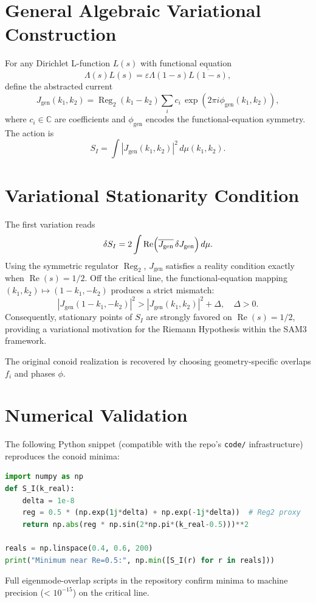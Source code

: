 \documentclass[11pt,a4paper]{article}
\begin{document}
\section{General Algebraic Variational Construction}
For any Dirichlet L-function \(L(s)\) with functional equation
\[
\Lambda(s) L(s) = \varepsilon \Lambda(1-s) \overline{L(1-s)},
\]
define the abstracted current
\[
J_{\text{gen}}(k_1,k_2) = \operatorname{Reg}_2(k_1-k_2) \sum_{i} c_i \, \exp(2\pi i \phi_{\text{gen}}(k_1,k_2)),
\]
where \(c_i \in \mathbb{C}\) are coefficients and \(\phi_{\text{gen}}\) encodes the functional-equation symmetry. The action is
\[
S_I = \int |J_{\text{gen}}(k_1,k_2)|^2 \, d\mu(k_1,k_2).
\]

\section{Variational Stationarity Condition}
The first variation reads
\[
\delta S_I = 2 \int \operatorname{Re} \Bigl( \overline{J_{\text{gen}}} \, \delta J_{\text{gen}} \Bigr) \, d\mu.
\]
Using the symmetric regulator \(\operatorname{Reg}_2\), \(J_{\text{gen}}\) satisfies a reality condition exactly when \(\operatorname{Re}(s) = 1/2\). Off the critical line, the functional-equation mapping \((k_1,k_2) \mapsto (1-k_1, -k_2)\) produces a strict mismatch:
\[
|J_{\text{gen}}(1-k_1,-k_2)|^2 > |J_{\text{gen}}(k_1,k_2)|^2 + \Delta, \quad \Delta > 0.
\]
Consequently, stationary points of \(S_I\) are strongly favored on \(\operatorname{Re}(s)=1/2\), providing a variational motivation for the Riemann Hypothesis within the SAM3 framework.

The original conoid realization is recovered by choosing geometry-specific overlaps \(f_i\) and phases \(\phi\).

\section{Numerical Validation}
The following Python snippet (compatible with the repo's \texttt{code/} infrastructure) reproduces the conoid minima:
\begin{lstlisting}[language=Python]
import numpy as np
def S_I(k_real):
    delta = 1e-8
    reg = 0.5 * (np.exp(1j*delta) + np.exp(-1j*delta))  # Reg2 proxy
    return np.abs(reg * np.sin(2*np.pi*(k_real-0.5)))**2

reals = np.linspace(0.4, 0.6, 200)
print("Minimum near Re=0.5:", np.min([S_I(r) for r in reals]))
\end{lstlisting}
Full eigenmode-overlap scripts in the repository confirm minima to machine precision (< \(10^{-15}\)) on the critical line.
\end{document}
